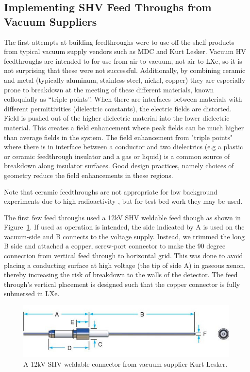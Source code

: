 \subsection{Implementing SHV Feed Throughs from Vacuum Suppliers}
The first attempts at building feedthroughs were to use off-the-shelf products from typical vacuum supply vendors such as MDC and Kurt Lesker. Vacuum \ac{HV} feedthroughs are intended to for use from air to vacuum, not air to \ac{LXe}, so it is not surprising that these were not successful. Additionally, by combining ceramic and metal (typically aluminum, stainless steel, nickel, copper) they are especially prone to breakdown at the meeting of these different materials, known colloquially as ``triple points''. When there are interfaces between materials with different permittivities (dielectric constants), the electric fields are distorted.  Field is pushed out of the higher dielectric material into the lower dielectric material. This creates a field enhancement where peak fields can be much higher than average fields in the system. The field enhancement from "triple points" where there is in interface between a conductor and two dielectrics (e.g a plastic or ceramic feedthrough insulator and a gas or liquid) is a common source of breakdown along insulator surfaces. Good design practices, namely choices of geometry reduce the field enhancements in these regions.


Note that ceramic feedthroughs are not appropriate for low background experiments due to high radioactivity , but for test bed work they may be used.

The first few feed throughs used a 12kV \ac{SHV} weldable feed though as shown in Figure~\ref{fig:12kV-SHV}. If used as operation is intended, the side indicated by A is used on the vacuum-side and B connects to the voltage supply. Instead, we trimmed the long B side and attached a copper, screw-port connector to make the 90 degree connection from vertical feed through to horizontal grid. This was done to avoid placing a conducting surface at high voltage (the tip of side A) in gaseous xenon, thereby increasing the risk of breakdown to the walls of the detector. The feed through's vertical placement is designed such that the copper connector is fully submersed in \ac{LXe}.

 
\begin{figure}[htbp]
\begin{center}
\includegraphics[width=5in]{figures/testbed/12kV-SHV.jpg}
\caption{A 12kV SHV weldable connector from vacuum supplier Kurt Lesker.}
\label{fig:12kV-SHV}
\end{center}
\end{figure}


